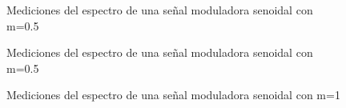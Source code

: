 \documentclass[../../labo_tp5_main.tex]{subfiles}
\begin{document}
\begin{figure}[H]	
	\centering
	\caption{Mediciones del espectro de una señal moduladora senoidal con m=0.5}
	\label{fig:ej1_labo_tp5_ej3_a_1}
\end{figure}
\begin{figure}[H]	
	\centering
	\caption{Mediciones del espectro de una señal moduladora senoidal con m=0.5}
	\label{fig:ej1_labo_tp5_ej3_a_1}
\end{figure}
\begin{figure}[H]	
	\centering
	\caption{Mediciones del espectro de una señal moduladora senoidal con m=1}
	\label{fig:ej1_labo_tp5_ej3_b}
\end{figure}
\end{document}
